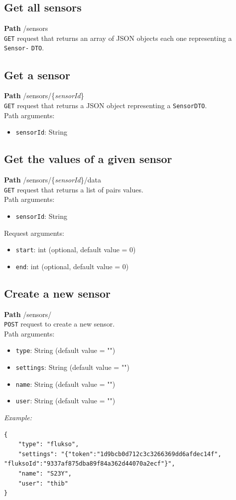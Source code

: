 \documentclass[a4paper, oneside, 11pt]{book}
\begin{document}
\subsection*{Get all sensors}
\textbf{Path} /sensors \\
\texttt{GET} request that returns an array of JSON objects each one representing a \texttt{Sensor-} \verb!DTO!.

\subsection*{Get a sensor}
\textbf{Path} /sensors/\{\textit{sensorId}\} \\
\texttt{GET} request that returns a JSON object representing a \texttt{SensorDTO}. \\
Path arguments:
\begin{itemize}
    \item \texttt{sensorId}: String
\end{itemize}

\subsection*{Get the values of a given sensor}
\textbf{Path} /sensors/\{\textit{sensorId}\}/data \\
\texttt{GET} request that returns a list of pairs values. \\
Path arguments:
\begin{itemize}
    \item \texttt{sensorId}: String
\end{itemize}
Request arguments:
\begin{itemize}
	\item \texttt{start}: int (optional, default value = 0)
	\item \texttt{end}: int (optional, default value = 0)
\end{itemize}

\subsection*{Create a new sensor}
\textbf{Path} /sensors/ \\
\texttt{POST} request to create a new sensor. \\
Path arguments:
\begin{itemize}
	\item \texttt{type}: String (default value = "")
	\item \texttt{settings}: String (default value = "")
	\item \texttt{name}: String (default value = "")
	\item \texttt{user}: String (default value = "")
\end{itemize}
\textit{Example:}
\begin{lstlisting}[breaklines]
{
	"type": "flukso",
	"settings": "{"token":"1d9bcb0d712c3c3266369dd6afdec14f", "fluksoId":"9337af875dba89f84a362d44070a2ecf"}",
	"name": "S23Y",
	"user": "thib"
}
\end{lstlisting}
\end{document}
